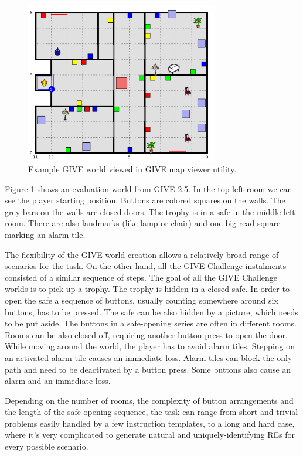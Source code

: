\begin{figure}[!htbp]
  \centering
	\includegraphics[width=0.75\textwidth]{Images/give-evalworldexmaple}
	\caption{Example GIVE world viewed in GIVE map viewer utility.}
	\label{fig:give-evalworldexmaple}
\end{figure}

Figure \ref{fig:give-evalworldexmaple} shows an evaluation world from GIVE-2.5. In the top-left room we can see the player starting position. Buttons are colored squares on the walls. The grey bars on the walls are closed doors. The trophy is in a safe in the middle-left room. There are also landmarks (like lamp or chair) and one big read square marking an alarm tile.

The flexibility of the GIVE world creation allows a relatively broad range of scenarios for the task. On the other hand, all the GIVE Challenge instalments consisted of a similar sequence of steps. The goal of all the GIVE Challenge worlds is to pick up a trophy. The trophy is hidden in a closed safe. In order to open the safe a sequence of buttons, usually counting somewhere around six buttons, has to be pressed. The safe can be also hidden by a picture, which needs to be put aside. The buttons in a safe-opening series are often in different rooms. Rooms can be also closed off, requiring another button press to open the door. While moving around the world, the player has to avoid alarm tiles. Stepping on an activated alarm tile causes an immediate loss. Alarm tiles can block the only path and need to be deactivated by a button press. Some buttons also cause an alarm and an immediate loss.

Depending on the number of rooms, the complexity of button arrangements and the length of the safe-opening sequence, the task can range from short and trivial problems easily handled by a few instruction templates, to a long and hard case, where it's very complicated to generate natural and uniquely-identifying REs for every possible scenario.

